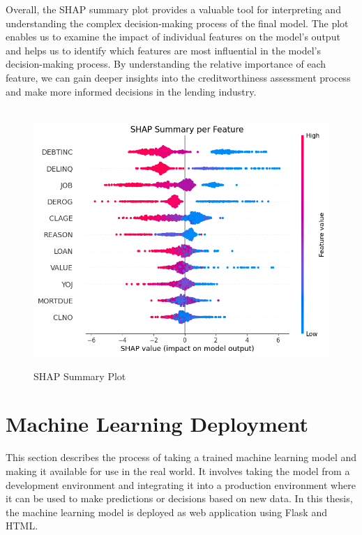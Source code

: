 Overall, the SHAP summary plot provides a valuable tool for interpreting and understanding the complex decision-making process of the final model.
The plot enables us to examine the impact of individual features on the model's output and helps us to identify which features are most influential in the model's decision-making process.
By understanding the relative importance of each feature, we can gain deeper insights into the creditworthiness assessment process and make more informed decisions in the lending industry.

\begin{figure}[H]
    \centering
    \caption{SHAP Summary Plot}\vspace{0.5em}
    \label{fig:shap}\
    \includegraphics[width=140mm]{Figures/SHAP_values.jpg}
    \vspace{-1em}
\end{figure}

\section{Machine Learning Deployment}
This section describes the process of taking a trained machine learning model and making it available for use in the real world. It involves taking the model from a development environment and integrating it into a production environment where it can be used to make predictions or decisions based on new data. In this thesis, the machine learning model is deployed as web application using Flask and HTML.
